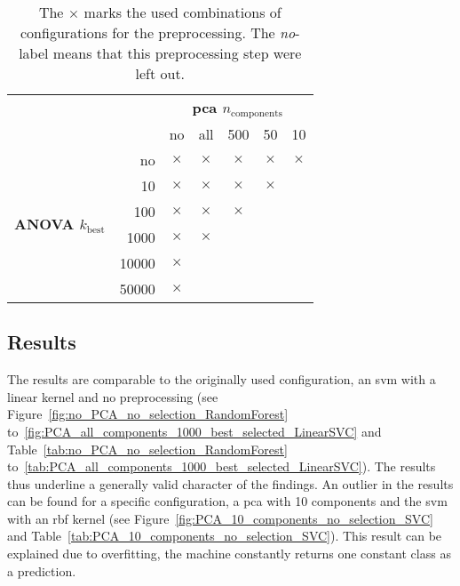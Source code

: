 \begin{table}[!htp]
    \begin{center}

        \begin{tabular}{rr|ccccc}
            & & \multicolumn{5}{c}{\textbf{\acs{pca} $n_\text{components}$}} \\
            &             & no       & all      & \num{500} & \num{50} & \num{10} \\
            \cline{2-7}
            \multirow{6}{*}{{\textbf{ANOVA $k_\text{best}$}}} & no & $\times$ & $\times$ & $\times$ & $\times$
            & $\times$
            \\
            & \num{10}    & $\times$ & $\times$ & $\times$  & $\times$ &          \\
            & \num{100}   & $\times$ & $\times$ & $\times$  &          &          \\
            & \num{1000}  & $\times$ & $\times$ &           &          &          \\
            & \num{10000} & $\times$ &          &           &          &          \\
            & \num{50000} & $\times$ &          &           &          &          \\

        \end{tabular}
        \vspace{6mm}
        \caption[Configurations for the preprocessing]{The $\times$ marks the used combinations of configurations for the preprocessing. The \emph{no}-label means that this preprocessing step were left out.}
        \label{tab:preprocessing}
    \end{center}
\end{table}

\FloatBarrier

\subsection{Results}
\label{cha:alternative-machine-configuration-results}
The results are comparable to the originally used configuration, an \ac{svm} with a linear kernel and no preprocessing (see Figure~\ref{fig:no_PCA_no_selection_RandomForest} to~\ref{fig:PCA_all_components_1000_best_selected_LinearSVC} and Table~\ref{tab:no_PCA_no_selection_RandomForest} to~\ref{tab:PCA_all_components_1000_best_selected_LinearSVC}). The results thus underline a generally valid character of the findings.
An outlier in the results can be found for a specific configuration, a \ac{pca} with 10 components and the \ac{svm} with an \ac{rbf} kernel (see Figure~\ref{fig:PCA_10_components_no_selection_SVC} and Table~\ref{tab:PCA_10_components_no_selection_SVC}). This result can be explained due to overfitting, the machine constantly returns one constant class as a prediction.
\FloatBarrier

